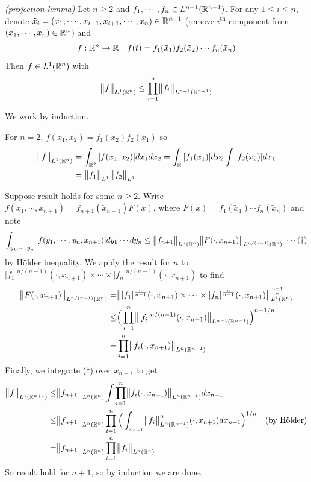 \documentclass[12pt,a4paper]{report}
\newenvironment{proof}
{\begin{changemargin}{1cm}{0.5cm} 
	}%
	{\end{changemargin}
}
\begin{document}
\lem \emph{(projection lemma)} Let $n\geq 2$ and $f_1, \cdots, f_n \in L^{n-1}(\mathbb{R}^{n-1})$. For any $1\leq i\leq n$, denote $\tilde{x}_i = (x_1, \cdots, x_{i-1}, x_{i+1}, \cdots, x_n) \in \mathbb{R}^{n-1}$ (remove $i^{\text{th}}$ component from $(x_1, \cdots, x_n) \in \mathbb{R}^n$) and
\begin{align*}
f : \mathbb{R}^n \rightarrow \mathbb{R} \quad f(t) = f_1(\tilde{x}_1) f_2(\tilde{x}_2) \cdots f_n(\tilde{x}_n)
\end{align*}
Then $f\in L^1(\mathbb{R}^n)$ with
\begin{align*}
\bigl\lVert f\bigr\rVert_{L^1(\mathbb{R}^n)} \leq \prod_{i=1}^n \bigl\lVert f_i\bigr\rVert_{L^{n-1}(\mathbb{R}^{n-1})}
\end{align*}
\begin{proof}
\pf We work by induction.

\quad For $n=2$, $f(x_1,x_2) = f_1(x_2)f_2(x_1)$ so
\begin{align*}
\bigl\lVert f\bigr\rVert_{L^1(\mathbb{R}^n)} &= \int_{\mathbb{R}^2} |f(x_1,x_2)| dx_1 dx_2 = \int_{\mathbb{R}} |f_1(x_1)| dx_2 \int |f_2(x_2)| dx_1 \\
&= \bigl\lVert f_1\bigr\rVert_{L^1} \bigl\lVert f_2\bigr\rVert_{L^1}
\end{align*}

\quad Suppose result holds for some $n \geq 2$. Write $f(x_1, \cdots, x_{n+1}) = f_{n+1}(\tilde{x}_{n+1}) F(x)$, where $F(x)  = f_1(\tilde{x}_1) \cdots f_n(\tilde{x}_n)$ and note
\begin{align*}
\int_{y_1, \cdots, y_n} |f(y_1,\cdots, y_n, x_{n+1})| dy_1 \cdots dy_n \leq \bigl\lVert f_{n+1}\bigr\rVert_{L^n(\mathbb{R}^n)} \bigl\lVert F(\cdot, x_{n+1})\bigr\rVert_{L^{n/(n-1)}(\mathbb{R}^n)} \,\, \cdots (\dagger)
\end{align*}
by H\"{o}lder inequality. We apply the result for $n$ to $|f_1|^{n/(n-1)}(\cdot, x_{n+1}) \times \cdots \times |f_n|^{n/(n-1)}(\cdot, x_{n+1})$ to find
\begin{align*}
\bigl\lVert F(\cdot, x_{n+1})\bigr\rVert_{L^{n/(n-1)}(\mathbb{R}^{n})} =& \bigl\lVert |f_1|^{\frac{n}{n-1}}(\cdot, x_{n+1}) \times \cdots \times |f_n|^{\frac{n}{n-1}}(\cdot, x_{n+1})\bigr\rVert_{L^1(\mathbb{R}^n)}^{\frac{n-1}{n}} \\
\leq & \Big( \prod_{i=1}^n \bigl\lVert |f_i|^{n/(n-1)} (\cdot, x_{n+1}) \bigr\rVert_{L^{n-1}(\mathbb{R}^{n-1})} \Big)^{n-1/n} \\
= & \prod_{i=1}^n \bigl\lVert f_i (\cdot, x_{n+1})\bigr\rVert_{L^n(\mathbb{R}^{n-1})}
\end{align*}
Finally, we integrate ($\dagger$) over $x_{n+1}$ to get
\begin{align*}
\bigl\lVert f\bigr\rVert_{L^1(\mathbb{R}^{n+1})} \leq & \bigl\lVert f_{n+1}\bigr\rVert_{L^n(\mathbb{R}^n)} \int \prod_{i=1}^n \bigl\lVert f_i(\cdot, x_{n+1})\bigr\rVert_{L^n(\mathbb{R}^{n-1})} dx_{n+1} \\
\leq & \bigl\lVert f_{n+1}\bigr\rVert_{L^n(\mathbb{R}^n)} \prod_{i=1}^n \Big(  \int_{x_{n+1}} \bigl\lVert f_i\bigr\rVert_{L^n(\mathbb{R}^{n-1})}^n (\cdot, x_{n+1}) dx_{n+1}  \Big)^{1/n} \quad \text{(by H\"{o}lder)} \\ 
= & \bigl\lVert f_{n+1}\bigr\rVert_{L^n(\mathbb{R}^n)} \prod_{i=1}^n \bigl\lVert f_i\bigr\rVert_{L^n(\mathbb{R}^n)}
\end{align*}
So result hold for $n+1$, so by induction we are done.

\eop
\end{proof}
\s
\end{document}
